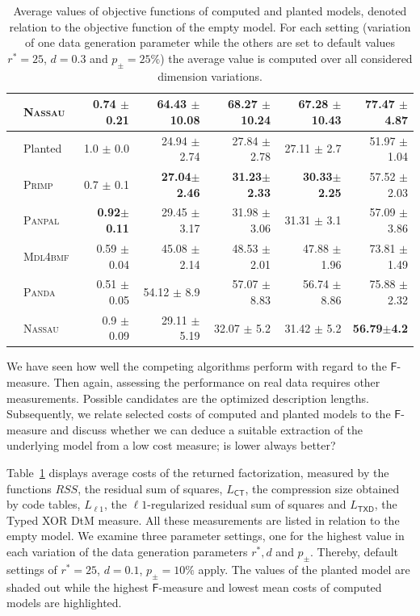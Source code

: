 \begin{table}
\begin{adjustbox}{max width=\textwidth}
\begin{tabular}{clrrrrr}
 & \textsc{Nassau} & 0.74 $\pm$ 0.21 & 64.43 $\pm$ 10.08 & 68.27 $\pm$ 10.24 & 67.28 $\pm$ 10.43 & 77.47 $\pm$ 4.87\\ \midrule
\rowcolor{black!10}
 \multirow{6}{*}{\cellcolor{white}\rotatebox{90}{ $d=0.3$ }  } 
&Planted &  1.0 $\pm$ 0.0  & 24.94 $\pm$ 2.74 & 27.84 $\pm$ 2.78 & 27.11 $\pm$ 2.7 & 51.97 $\pm$ 1.04\\
 & \textsc{Primp} & 0.7 $\pm$ 0.1  & \textbf{27.04}$\pm$\textbf{2.46} & \textbf{31.23}$\pm$\textbf{2.33} & \textbf{30.33}$\pm$\textbf{2.25} & 57.52 $\pm$ 2.03\\
 & \textsc{Panpal}  & \textbf{0.92}$\pm$\textbf{0.11} & 29.45 $\pm$ 3.17 & 31.98 $\pm$ 3.06 & 31.31 $\pm$ 3.1 & 57.09 $\pm$ 3.86\\
 & \textsc{Mdl4bmf} & 0.59 $\pm$ 0.04 & 45.08 $\pm$ 2.14 & 48.53 $\pm$ 2.01 & 47.88 $\pm$ 1.96 & 73.81 $\pm$ 1.49\\
 & \textsc{Panda} & 0.51 $\pm$ 0.05 & 54.12 $\pm$ 8.9 & 57.07 $\pm$ 8.83 & 56.74 $\pm$ 8.86 & 75.88 $\pm$ 2.32\\
 & \textsc{Nassau} & 0.9 $\pm$ 0.09 & 29.11 $\pm$ 5.19 & 32.07 $\pm$ 5.2 & 31.42 $\pm$ 5.2 & \textbf{56.79}$\pm$\textbf{4.2}\\ 
 \bottomrule
\end{tabular}
\end{adjustbox}
\caption{Average values of objective functions of computed and planted models, denoted relation to the objective function of the empty model. For each setting (variation of one data generation parameter while the others are set to default values $r^*=25$, $d=0.3$ and $p_\pm=25\%$) the average value is computed over all considered dimension variations.}
\label{tbl:avgCosts}
\end{table}

We have seen how well the competing algorithms perform with regard to the $\mathsf{F}$-measure. Then again, assessing the performance on real data requires other measurements. Possible candidates are the optimized description lengths. Subsequently, we relate selected costs of computed and planted models to the $\mathsf{F}$-measure and discuss whether we can deduce a suitable extraction of the underlying model from a low cost measure; is lower always better? 

Table~\ref{tbl:avgCosts} displays average costs of the returned factorization, measured by the functions $RSS$, the residual sum of squares, $L_{\mathsf{CT}}$, the compression size obtained by code tables, $L_{\ell 1}$, the $\ell 1$-regularized residual sum of squares and $L_{\mathsf{TXD}}$, the Typed XOR DtM measure. All these measurements are listed in relation to the empty model. We examine three parameter settings, one for the highest value in each variation of the data generation parameters $r^*, d$ and $p_\pm$. Thereby, default settings of $r^*=25$, $d=0.1$, $p_\pm=10\%$ apply. The values of the planted model are shaded out while the highest $\mathsf{F}$-measure and lowest mean costs of computed models are highlighted. 

